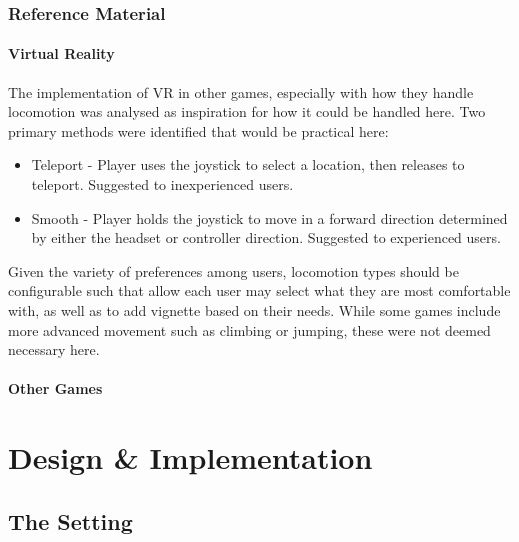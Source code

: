 \documentclass[sigconf,authordraft]{acmart}
\begin{document}
\subsubsection{Reference Material}

\paragraph{Virtual Reality}
The implementation of VR in other games, especially with how they handle
locomotion was analysed as inspiration for how it could be handled here. Two
primary methods were identified that would be practical here:

\begin{itemize}
  \item Teleport - Player uses the joystick to select a location, then releases
    to teleport. Suggested to inexperienced users.
  \item Smooth - Player holds the joystick to move in a forward direction
    determined by either the headset or controller direction. Suggested to
    experienced users.
\end{itemize}

Given the variety of preferences among users, locomotion types should be
configurable such that allow each user may select what they are most comfortable
with, as well as to add vignette based on their needs. While some games include
more advanced movement such as climbing or jumping, these were not deemed
necessary here.



\paragraph{Other Games}

\section{Design \& Implementation}

\subsection{The Setting}
\end{document}
